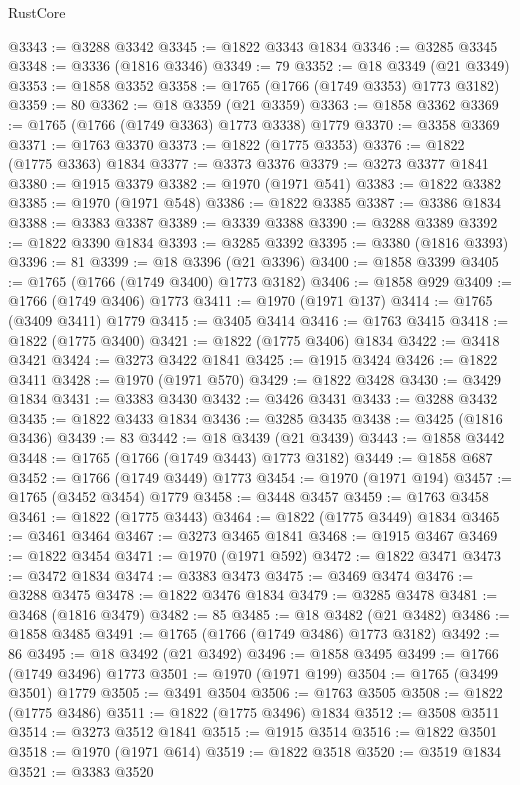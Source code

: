 \begin{lexlean}{RustCore}
\begin{coremodule}
@3343 := @3288 @3342
@3345 := @1822 @3343 @1834
@3346 := @3285 @3345
@3348 := @3336 (@1816 @3346)
@3349 := 79
@3352 := @18 @3349 (@21 @3349)
@3353 := @1858 @3352
@3358 := @1765 (@1766 (@1749 @3353) @1773 @3182)
@3359 := 80
@3362 := @18 @3359 (@21 @3359)
@3363 := @1858 @3362
@3369 := @1765 (@1766 (@1749 @3363) @1773 @3338) @1779
@3370 := @3358 @3369
@3371 := @1763 @3370
@3373 := @1822 (@1775 @3353)
@3376 := @1822 (@1775 @3363) @1834
@3377 := @3373 @3376
@3379 := @3273 @3377 @1841
@3380 := @1915 @3379
@3382 := @1970 (@1971 @541)
@3383 := @1822 @3382
@3385 := @1970 (@1971 @548)
@3386 := @1822 @3385
@3387 := @3386 @1834
@3388 := @3383 @3387
@3389 := @3339 @3388
@3390 := @3288 @3389
@3392 := @1822 @3390 @1834
@3393 := @3285 @3392
@3395 := @3380 (@1816 @3393)
@3396 := 81
@3399 := @18 @3396 (@21 @3396)
@3400 := @1858 @3399
@3405 := @1765 (@1766 (@1749 @3400) @1773 @3182)
@3406 := @1858 @929
@3409 := @1766 (@1749 @3406) @1773
@3411 := @1970 (@1971 @137)
@3414 := @1765 (@3409 @3411) @1779
@3415 := @3405 @3414
@3416 := @1763 @3415
@3418 := @1822 (@1775 @3400)
@3421 := @1822 (@1775 @3406) @1834
@3422 := @3418 @3421
@3424 := @3273 @3422 @1841
@3425 := @1915 @3424
@3426 := @1822 @3411
@3428 := @1970 (@1971 @570)
@3429 := @1822 @3428
@3430 := @3429 @1834
@3431 := @3383 @3430
@3432 := @3426 @3431
@3433 := @3288 @3432
@3435 := @1822 @3433 @1834
@3436 := @3285 @3435
@3438 := @3425 (@1816 @3436)
@3439 := 83
@3442 := @18 @3439 (@21 @3439)
@3443 := @1858 @3442
@3448 := @1765 (@1766 (@1749 @3443) @1773 @3182)
@3449 := @1858 @687
@3452 := @1766 (@1749 @3449) @1773
@3454 := @1970 (@1971 @194)
@3457 := @1765 (@3452 @3454) @1779
@3458 := @3448 @3457
@3459 := @1763 @3458
@3461 := @1822 (@1775 @3443)
@3464 := @1822 (@1775 @3449) @1834
@3465 := @3461 @3464
@3467 := @3273 @3465 @1841
@3468 := @1915 @3467
@3469 := @1822 @3454
@3471 := @1970 (@1971 @592)
@3472 := @1822 @3471
@3473 := @3472 @1834
@3474 := @3383 @3473
@3475 := @3469 @3474
@3476 := @3288 @3475
@3478 := @1822 @3476 @1834
@3479 := @3285 @3478
@3481 := @3468 (@1816 @3479)
@3482 := 85
@3485 := @18 @3482 (@21 @3482)
@3486 := @1858 @3485
@3491 := @1765 (@1766 (@1749 @3486) @1773 @3182)
@3492 := 86
@3495 := @18 @3492 (@21 @3492)
@3496 := @1858 @3495
@3499 := @1766 (@1749 @3496) @1773
@3501 := @1970 (@1971 @199)
@3504 := @1765 (@3499 @3501) @1779
@3505 := @3491 @3504
@3506 := @1763 @3505
@3508 := @1822 (@1775 @3486)
@3511 := @1822 (@1775 @3496) @1834
@3512 := @3508 @3511
@3514 := @3273 @3512 @1841
@3515 := @1915 @3514
@3516 := @1822 @3501
@3518 := @1970 (@1971 @614)
@3519 := @1822 @3518
@3520 := @3519 @1834
@3521 := @3383 @3520

\end{coremodule}
\end{lexlean}
